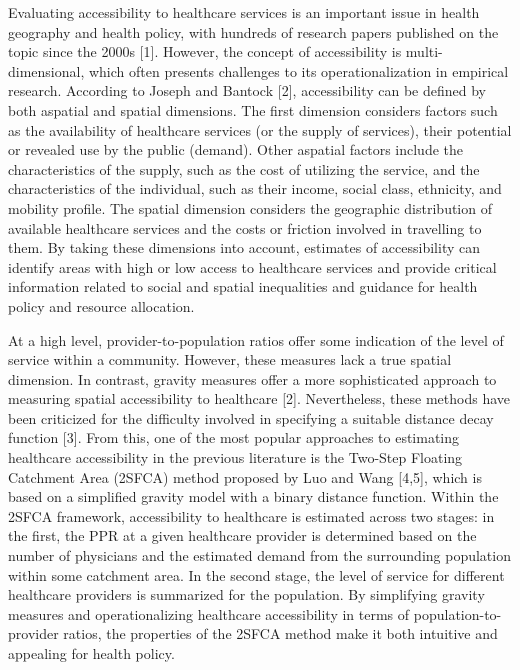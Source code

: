\documentclass[10pt,letterpaper]{article}
\begin{document}
Evaluating accessibility to healthcare services is an important issue in
health geography and health policy, with hundreds of research papers
published on the topic since the 2000s {[}1{]}. However, the concept of
accessibility is multi-dimensional, which often presents challenges to
its operationalization in empirical research. According to Joseph and
Bantock {[}2{]}, accessibility can be defined by both aspatial and
spatial dimensions. The first dimension considers factors such as the
availability of healthcare services (or the supply of services), their
potential or revealed use by the public (demand). Other aspatial factors
include the characteristics of the supply, such as the cost of utilizing
the service, and the characteristics of the individual, such as their
income, social class, ethnicity, and mobility profile. The spatial
dimension considers the geographic distribution of available healthcare
services and the costs or friction involved in travelling to them. By
taking these dimensions into account, estimates of accessibility can
identify areas with high or low access to healthcare services and
provide critical information related to social and spatial inequalities
and guidance for health policy and resource allocation.

At a high level, provider-to-population ratios offer some indication of
the level of service within a community. However, these measures lack a
true spatial dimension. In contrast, gravity measures offer a more
sophisticated approach to measuring spatial accessibility to healthcare
{[}2{]}. Nevertheless, these methods have been criticized for the
difficulty involved in specifying a suitable distance decay function
{[}3{]}. From this, one of the most popular approaches to estimating
healthcare accessibility in the previous literature is the Two-Step
Floating Catchment Area (2SFCA) method proposed by Luo and Wang
{[}4,5{]}, which is based on a simplified gravity model with a binary
distance function. Within the 2SFCA framework, accessibility to
healthcare is estimated across two stages: in the first, the PPR at a
given healthcare provider is determined based on the number of
physicians and the estimated demand from the surrounding population
within some catchment area. In the second stage, the level of service
for different healthcare providers is summarized for the population. By
simplifying gravity measures and operationalizing healthcare
accessibility in terms of population-to-provider ratios, the properties
of the 2SFCA method make it both intuitive and appealing for health
policy.
\end{document}
